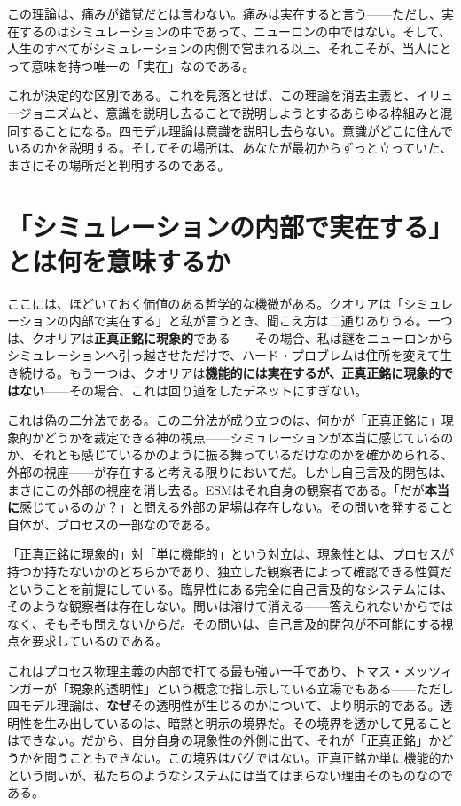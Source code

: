\documentclass[11pt, twoside, openright]{book}
\begin{document}
この理論は、痛みが錯覚だとは言わない。痛みは実在すると言う------ただし、実在するのはシミュレーションの中であって、ニューロンの中ではない。そして、人生のすべてがシミュレーションの内側で営まれる以上、それこそが、当人にとって意味を持つ唯一の「実在」なのである。

これが決定的な区別である。これを見落とせば、この理論を消去主義と、イリュージョニズムと、意識を説明し去ることで説明しようとするあらゆる枠組みと混同することになる。四モデル理論は意識を説明し去らない。意識がどこに住んでいるのかを説明する。そしてその場所は、あなたが最初からずっと立っていた、まさにその場所だと判明するのである。

\section*{「シミュレーションの内部で実在する」とは何を意味するか}

ここには、ほどいておく価値のある哲学的な機微がある。クオリアは「シミュレーションの内部で実在する」と私が言うとき、聞こえ方は二通りありうる。一つは、クオリアは\textbf{正真正銘に現象的}である------その場合、私は謎をニューロンからシミュレーションへ引っ越させただけで、ハード・プロブレムは住所を変えて生き続ける。もう一つは、クオリアは\textbf{機能的には実在するが、正真正銘に現象的ではない}------その場合、これは回り道をしたデネットにすぎない。

これは偽の二分法である。この二分法が成り立つのは、何かが「正真正銘に」現象的かどうかを裁定できる神の視点------シミュレーションが本当に感じているのか、それとも感じているかのように振る舞っているだけなのかを確かめられる、外部の視座------が存在すると考える限りにおいてだ。しかし自己言及的閉包は、まさにこの外部の視座を消し去る。ESMはそれ自身の観察者である。「だが\textbf{本当に}感じているのか？」と問える外部の足場は存在しない。その問いを発すること自体が、プロセスの一部なのである。

「正真正銘に現象的」対「単に機能的」という対立は、現象性とは、プロセスが持つか持たないかのどちらかであり、独立した観察者によって確認できる性質だということを前提にしている。臨界性にある完全に自己言及的なシステムには、そのような観察者は存在しない。問いは溶けて消える------答えられないからではなく、そもそも問えないからだ。その問いは、自己言及的閉包が不可能にする視点を要求しているのである。

これはプロセス物理主義の内部で打てる最も強い一手であり、トマス・メッツィンガーが「現象的透明性」という概念で指し示している立場でもある------ただし四モデル理論は、\textbf{なぜ}その透明性が生じるのかについて、より明示的である。透明性を生み出しているのは、暗黙と明示の境界だ。その境界を透かして見ることはできない。だから、自分自身の現象性の外側に出て、それが「正真正銘」かどうかを問うこともできない。この境界はバグではない。正真正銘か単に機能的かという問いが、私たちのようなシステムには当てはまらない理由そのものなのである。
\end{document}
